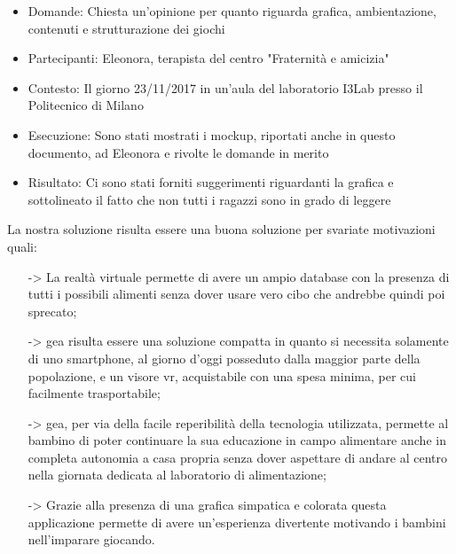 \begin{enumerate}
		\begin{itemize}
		\item Domande:  Chiesta un'opinione per quanto riguarda grafica, ambientazione, contenuti e 								strutturazione dei giochi
		\item Partecipanti: Eleonora, terapista del centro "Fraternità e amicizia"
		\item Contesto: Il giorno 23/11/2017 in un'aula del laboratorio I3Lab presso il Politecnico di 								Milano
		\item Esecuzione: Sono stati mostrati i mockup, riportati anche in questo documento, ad Eleonora e 						  rivolte le domande in merito
		\item Risultato: Ci sono stati forniti suggerimenti riguardanti la grafica e sottolineato il fatto 						 che non tutti i ragazzi sono in grado di leggere   
		\end{itemize}
\end{enumerate}


La nostra soluzione risulta essere una buona soluzione per svariate motivazioni quali:
\begin{itemize}
\item[->] La realtà virtuale permette di avere un ampio database con la presenza di tutti i possibili alimenti senza dover usare vero cibo che andrebbe quindi poi sprecato;
\item[->] \acs{gea} risulta essere una soluzione compatta in quanto si necessita solamente di uno smartphone, al giorno d'oggi posseduto dalla maggior parte della popolazione, e un visore \acs{vr}, acquistabile con una spesa minima, per cui facilmente trasportabile;
\item[->] \acs{gea}, per via della facile reperibilità della tecnologia utilizzata, permette al bambino di poter continuare la sua educazione in campo alimentare anche in completa autonomia a casa propria senza dover aspettare di andare al centro nella giornata dedicata al laboratorio di alimentazione;
\item[->] Grazie alla presenza di una grafica simpatica e colorata questa applicazione permette di avere un'esperienza divertente motivando i bambini nell'imparare giocando.
\end{itemize}